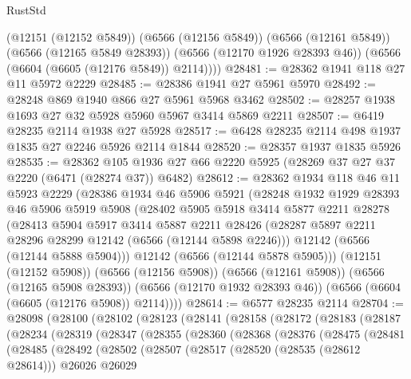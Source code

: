 \begin{lexlean}{RustStd}
\begin{coremodule}
{\begin{coremodule}
{{{{{{{{{{{{{{{{{{{{{{{{{{        (@12151 (@12152 @5849))
        (@6566 (@12156 @5849))
        (@6566 (@12161 @5849))
        (@6566 (@12165 @5849 @28393))
        (@6566 (@12170 @1926 @28393 @46))
        (@6566 (@6604 (@6605 (@12176 @5849)) @2114))))
@28481 := @28362 @1941 @118 @27 @11 @5972 @2229
@28485 := @28386 @1941 @27 @5961 @5970
@28492 := @28248 @869 @1940 @866 @27 @5961 @5968 @3462
@28502 := @28257 @1938 @1693 @27 @32 @5928 @5960 @5967 @3414 @5869 @2211
@28507 := @6419 @28235 @2114 @1938 @27 @5928
@28517 := @6428 @28235 @2114 @498 @1937 @1835 @27 @2246 @5926 @2114 @1844
@28520 := @28357 @1937 @1835 @5926
@28535 := @28362
    @105
    @1936
    @27
    @66
    @2220
    @5925
    (@28269 @37 @27 @37 @2220 (@6471 (@28274 @37)) @6482)
@28612 := @28362
    @1934
    @118
    @46
    @11
    @5923
    @2229
    (@28386
      @1934
      @46
      @5906
      @5921
      (@28248
        @1932
        @1929
        @28393
        @46
        @5906
        @5919
        @5908
        (@28402
          @5905
          @5918
          @3414
          @5877
          @2211
          @28278
          (@28413
            @5904
            @5917
            @3414
            @5887
            @2211
            @28426
            (@28287 @5897 @2211 @28296 @28299 @12142 (@6566 (@12144 @5898 @2246)))
            @12142
            (@6566 (@12144 @5888 @5904)))
          @12142
          (@6566 (@12144 @5878 @5905)))
        (@12151 (@12152 @5908))
        (@6566 (@12156 @5908))
        (@6566 (@12161 @5908))
        (@6566 (@12165 @5908 @28393))
        (@6566 (@12170 @1932 @28393 @46))
        (@6566 (@6604 (@6605 (@12176 @5908)) @2114))))
@28614 := @6577 @28235 @2114
@28704 := @28098
    (@28100
      (@28102
        (@28123
          (@28141
            (@28158
              (@28172
                (@28183
                  (@28187
                    (@28234
                      (@28319
                        (@28347
                          (@28355
                            (@28360
                              (@28368
                                (@28376
                                  (@28475
                                    (@28481
                                      (@28485
                                        (@28492
                                          (@28502
                                            (@28507
                                              (@28517
                                                (@28520 (@28535 (@28612 @28614)))
                                                @26026
                                                @26029
}}}}}}}}}}}}}}}}}}}}}}}}}}
\end{coremodule}}
\end{coremodule}
\end{lexlean}
